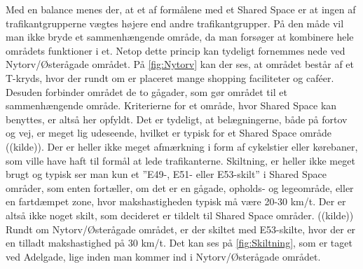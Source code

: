 Med en balance menes der, at et af formålene med et Shared Space er at ingen af trafikantgrupperne vægtes højere end andre trafikantgrupper. På den måde vil man ikke bryde et sammenhængende område, da man forsøger at kombinere hele områdets funktioner i et. Netop dette princip kan tydeligt fornemmes nede ved Nytorv/Østerågade området. På \cref{fig:Nytorv} kan der ses, at området består af et T-kryds, hvor der rundt om er placeret mange shopping faciliteter og caféer. Desuden forbinder området de to gågader, som gør området til et sammenhængende område. Kriterierne for et område, hvor Shared Space kan benyttes, er altså her opfyldt.
Det er tydeligt, at belægningerne, både på fortov og vej, er meget lig udeseende, hvilket er typisk for et Shared Space område ((kilde)). Der er heller ikke meget afmærkning i form af cykelstier eller kørebaner, som ville have haft til formål at lede trafikanterne. Skiltning, er heller ikke meget brugt og typisk ser man kun et ”E49-, E51- eller E53-skilt” i Shared Space områder, som enten fortæller, om det er en gågade, opholds- og legeområde, eller en fartdæmpet zone, hvor makshastigheden typisk må være 20-30 km/t. Der er altså ikke noget skilt, som decideret er tildelt til Shared Space områder. ((kilde)) Rundt om Nytorv/Østerågade området, er der skiltet med E53-skilte, hvor der er en tilladt makshastighed på 30 km/t. Det kan ses på \cref{fig:Skiltning}, som er taget ved Adelgade, lige inden man kommer ind i Nytorv/Østerågade området.

